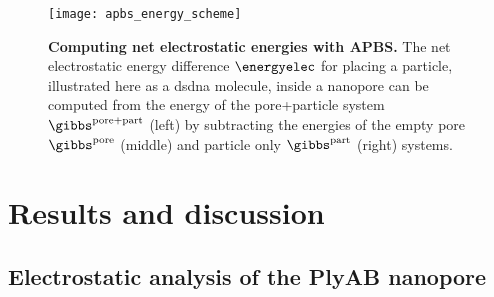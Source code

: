 %
\begin{figure*}[t]
  \centering
  \medskip
  \texttt{[image: apbs\_energy\_scheme]}

\caption[Computing net electrostatic energies with APBS.]{%
  \textbf{Computing net electrostatic energies with APBS.}
  The net electrostatic energy difference $\energyelec$ for placing a particle, illustrated here as a
  \gls{dsdna} molecule, inside a nanopore can be computed from the energy of the pore+particle system
  $\gibbs^{\rm{pore+part}}$ (left) by subtracting the energies of the empty pore $\gibbs^{\rm{pore}}$
  (middle) and particle only $\gibbs^{\rm{part}}$ (right) systems.
  }\label{fig:apbs_energy_scheme}
\end{figure*}
%

%
\clearpage
%


\section{Results and discussion}
%
\label{sec:elec:results}
%


\subsection{Electrostatic analysis of the PlyAB nanopore}
%
\label{sec:elec:plyab}
%


